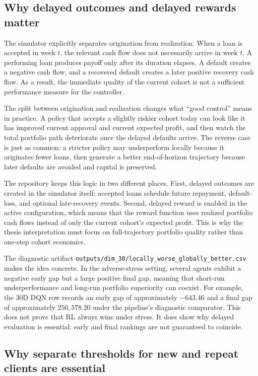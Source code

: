 \documentclass[12pt,a4paper]{article}
\begin{document}
\subsection{Why delayed outcomes and delayed rewards matter}

The simulator explicitly separates origination from realization. When a loan is accepted in week $t$, the relevant cash flow does not necessarily arrive in week $t$. A performing loan produces payoff only after its duration elapses. A default creates a negative cash flow, and a recovered default creates a later positive recovery cash flow. As a result, the immediate quality of the current cohort is not a sufficient performance measure for the controller.

The split between origination and realization changes what ``good control'' means in practice. A policy that accepts a slightly riskier cohort today can look like it has improved current approval and current expected profit, and then watch the total portfolio path deteriorate once the delayed defaults arrive. The reverse case is just as common: a stricter policy may underperform locally because it originates fewer loans, then generate a better end-of-horizon trajectory because later defaults are avoided and capital is preserved.

The repository keeps this logic in two different places. First, delayed outcomes are created in the simulator itself: accepted loans schedule future repayment, default-loss, and optional late-recovery events. Second, delayed reward is enabled in the active configuration, which means that the reward function uses realized portfolio cash flows instead of only the current cohort's expected profit. This is why the thesis interpretation must focus on full-trajectory portfolio quality rather than one-step cohort economics.

The diagnostic artifact \texttt{outputs/dim\_30/locally\_worse\_globally\_better.csv} makes the idea concrete. In the adverse-stress setting, several agents exhibit a negative early gap but a large positive final gap, meaning that short-run underperformance and long-run portfolio superiority can coexist. For example, the 30D DQN row records an early gap of approximately $-643.46$ and a final gap of approximately $250{,}578.20$ under the pipeline's diagnostic comparator. This does not prove that RL always wins under stress. It does show why delayed evaluation is essential: early and final rankings are not guaranteed to coincide.

\subsection{Why separate thresholds for new and repeat clients are essential}
\end{document}
